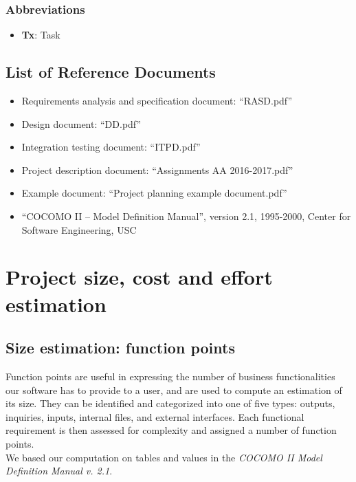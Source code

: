 \documentclass[english]{article}
\begin{document}
\subsubsection{Abbreviations}
\begin{itemize}
	\item{\textbf{Tx}: Task}
\end{itemize}

\subsection{List of Reference Documents}

\begin{itemize}
	\item{Requirements analysis and specification document: “RASD.pdf”}
	\item{Design document: “DD.pdf”}
	\item{Integration testing document: “ITPD.pdf”}
	\item{Project description document: “Assignments AA 2016-2017.pdf”}
	\item{Example document: “Project planning example document.pdf”}
	\item{“COCOMO II -- Model Definition Manual”, version 2.1, 1995-2000, Center for Software Engineering, USC} %
\end{itemize}

\section{Project size, cost and effort estimation}


\subsection{Size estimation: function points}
Function points are useful in expressing the number of business functionalities our software has to provide to a user, and are used to compute an estimation of its size.
They can be identified and categorized into one of five types: outputs, inquiries, inputs, internal files, and external interfaces. Each functional requirement is then assessed for complexity and assigned a number of function points.\\
We based our computation on tables and values in the \emph{COCOMO II Model Definition Manual v. 2.1}.
\end{document}
